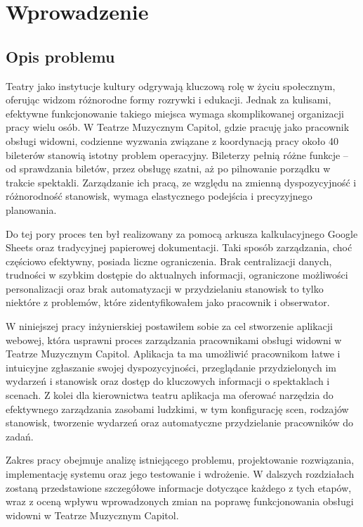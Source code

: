 \documentclass[shortabstract]{iithesis}
\author         {Adam Jarząbek}
\date          {20 czerwca 2024}                     %
\begin{document}

\chapter{Wprowadzenie}

\section{Opis problemu}

Teatry jako instytucje kultury odgrywają kluczową rolę w życiu społecznym, oferując widzom różnorodne formy rozrywki i edukacji. Jednak za kulisami, efektywne funkcjonowanie takiego miejsca wymaga skomplikowanej organizacji pracy wielu osób. W Teatrze Muzycznym Capitol, gdzie pracuję jako pracownik obsługi widowni, codzienne wyzwania związane z koordynacją pracy około 40 bileterów stanowią istotny problem operacyjny. Bileterzy pełnią różne funkcje – od sprawdzania biletów, przez obsługę szatni, aż po pilnowanie porządku w trakcie spektakli. Zarządzanie ich pracą, ze względu na zmienną dyspozycyjność i różnorodność stanowisk, wymaga elastycznego podejścia i precyzyjnego planowania.

Do tej pory proces ten był realizowany za pomocą arkusza kalkulacyjnego Google Sheets oraz tradycyjnej papierowej dokumentacji. Taki sposób zarządzania, choć częściowo efektywny, posiada liczne ograniczenia. Brak centralizacji danych, trudności w szybkim dostępie do aktualnych informacji, ograniczone możliwości personalizacji oraz brak automatyzacji w przydzielaniu stanowisk to tylko niektóre z problemów, które zidentyfikowałem jako pracownik i obserwator.

W niniejszej pracy inżynierskiej postawiłem sobie za cel stworzenie aplikacji webowej, która usprawni proces zarządzania pracownikami obsługi widowni w Teatrze Muzycznym Capitol. Aplikacja ta ma umożliwić pracownikom łatwe i intuicyjne zgłaszanie swojej dyspozycyjności, przeglądanie przydzielonych im wydarzeń i stanowisk oraz dostęp do kluczowych informacji o spektaklach i scenach. Z kolei dla kierownictwa teatru aplikacja ma oferować narzędzia do efektywnego zarządzania zasobami ludzkimi, w tym konfigurację scen, rodzajów stanowisk, tworzenie wydarzeń oraz automatyczne przydzielanie pracowników do zadań.

Zakres pracy obejmuje analizę istniejącego problemu, projektowanie rozwiązania, implementację systemu oraz jego testowanie i wdrożenie. W dalszych rozdziałach zostaną przedstawione szczegółowe informacje dotyczące każdego z tych etapów, wraz z oceną wpływu wprowadzonych zmian na poprawę funkcjonowania obsługi widowni w Teatrze Muzycznym Capitol.
\end{document}
